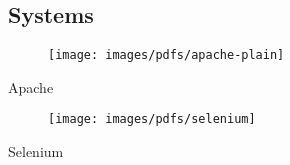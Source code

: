 \begin{aside}
    \subsection{Systems}
      \vspace{0.4mm}%
      \begin{minipage}[t]{8mm}
        \vspace{-4mm}
        \begin{center}
          \begin{figure}
            \texttt{[image: images/pdfs/apache-plain]}
          \end{figure}
          \vspace{1.8mm}
          \small{Apache}
        \end{center}
      \end{minipage}%
      \hspace{2.8mm}%
      \hspace{-0.5mm}%
      \hspace{0mm}%
      \begin{center}
        \begin{minipage}[t]{12mm}
          \begin{center}
            \begin{figure}
              \texttt{[image: images/pdfs/selenium]}
            \end{figure}
            \vspace{0mm}
            \small{Selenium}
          \end{center}
        \end{minipage}\hspace{0.5mm}%
      \end{center}


\end{aside}
